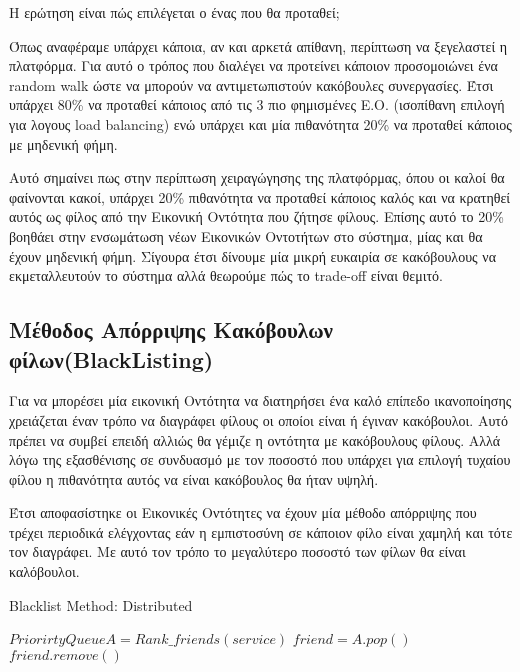 Η ερώτηση είναι πώς επιλέγεται ο ένας που θα προταθεί;

Όπως αναφέραμε υπάρχει κάποια, αν και αρκετά απίθανη, περίπτωση να ξεγελαστεί η πλατφόρμα. Για αυτό ο τρόπος που διαλέγει να προτείνει κάποιον προσομοιώνει ένα random walk ώστε να μπορούν να αντιμετωπιστούν κακόβουλες συνεργασίες. Έτσι υπάρχει 80\% να προταθεί κάποιος από τις 3 πιο φημισμένες Ε.Ο. (ισοπίθανη επιλογή για λογους load balancing) ενώ υπάρχει και μία πιθανότητα 20\% να προταθεί κάποιος με μηδενική φήμη.

Αυτό σημαίνει πως στην περίπτωση χειραγώγησης της πλατφόρμας, όπου οι καλοί θα φαίνονται κακοί, υπάρχει 20\% πιθανότητα να προταθεί κάποιος καλός και να  κρατηθεί αυτός ως φίλος από την Εικονική Οντότητα που ζήτησε φίλους. Επίσης αυτό το 20\% βοηθάει στην ενσωμάτωση νέων Εικονικών Οντοτήτων στο σύστημα, μίας και θα έχουν μηδενική φήμη.
Σίγουρα έτσι δίνουμε μία μικρή ευκαιρία σε κακόβουλους να εκμεταλλευτούν το σύστημα αλλά θεωρούμε πώς το trade-off είναι θεμιτό.
\newpage

\subsection{Μέθοδος Απόρριψης Κακόβουλων φίλων(BlackListing)}\label{sec:blacklisting}

Για να μπορέσει μία εικονική Οντότητα να διατηρήσει ένα καλό επίπεδο ικανοποίησης χρειάζεται έναν τρόπο να διαγράφει φίλους οι οποίοι είναι ή έγιναν κακόβουλοι. Αυτό πρέπει να συμβεί επειδή αλλιώς θα γέμιζε η οντότητα με κακόβουλους φίλους. Αλλά λόγω της εξασθένισης σε συνδυασμό με τον ποσοστό που υπάρχει για επιλογή τυχαίου φίλου η πιθανότητα αυτός να είναι κακόβουλος θα ήταν υψηλή.

Έτσι αποφασίστηκε οι Εικονικές Οντότητες να έχουν μία μέθοδο απόρριψης που τρέχει περιοδικά ελέγχοντας εάν η εμπιστοσύνη σε κάποιον φίλο είναι χαμηλή και τότε τον διαγράφει. Με αυτό τον τρόπο το μεγαλύτερο ποσοστό των φίλων θα είναι καλόβουλοι.
\begin{algorithm}
\caption{Blacklist Method: Distributed}
\label{blacklist}
\begin{algorithmic}[1]
\State $ Priorirty Queue A =  Rank\_friends\left(service\right)$
\State $friend=A.pop\left(\right)$
\State $friend.remove\left(\right)$
\EndIf
\EndWhile
\EndFor
\EndProcedure
\end{algorithmic}
\end{algorithm}



